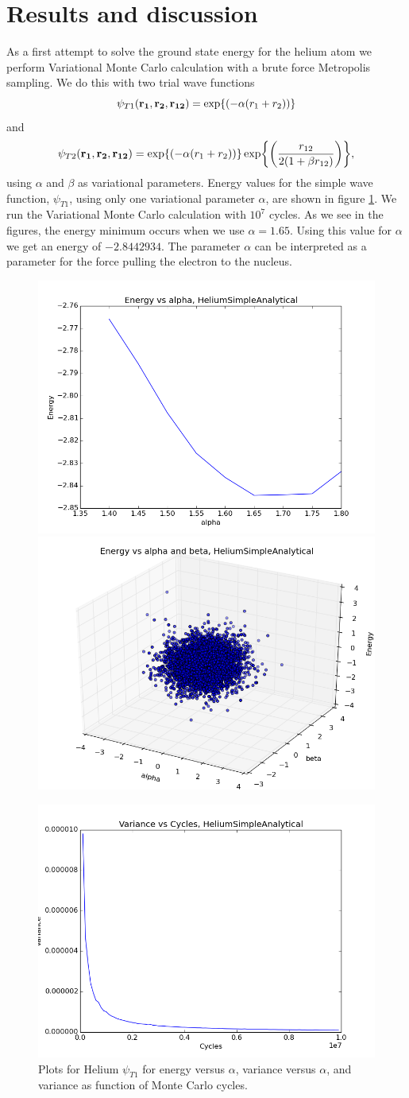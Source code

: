 \documentclass[11pt]{article}
\begin{document}
\section{Results and discussion}
	

As a first attempt to solve the ground state energy for the helium
atom we perform Variational Monte Carlo calculation with a brute force
Metropolis sampling. We do this with two trial wave functions
\[
\psi_{T1}({\bf r_{1}},{\bf r_{2}},{\bf r_{12}})=\exp{\left(-\alpha(r_{1}+r_{2})\right)}
\]
and 
\[
\psi_{T2}({\bf r_{1}},{\bf r_{2}},{\bf r_{12}})=\exp{\left(-\alpha(r_{1}+r_{2})\right)}\exp{\left(\frac{r_{12}}{2(1+\beta r_{12})}\right)},
\]
using $\alpha$ and $\beta$ as variational parameters. Energy values
for the simple wave function, $\psi_{T1}$, using only one variational
parameter $\alpha$, are shown in figure \ref{fig01:alpha_Simple}.
We run the Variational Monte Carlo calculation with $10^{7}$ cycles.
As we see in the figures, the energy minimum occurs when we use $\alpha=1.65$.
Using this value for $\alpha$ we get an energy of $-2.8442934$. 
The parameter $\alpha$ can be interpreted as a parameter for the
force pulling the electron to the nucleus. 

\begin{figure}
\centering \includegraphics[width=0.45\linewidth]{figures/EnergyVsAlphaHeliumSimpleAnalytical}
\includegraphics[width=0.45\linewidth]{figures/VarianceVsAlphaHeliumSimpleAnalytical}

\includegraphics[width=0.45\linewidth]{figures/VarianceNCyclesHeliumSimpleAnalytical}\protect\protect\caption{Plots for Helium $\psi_{T1}$ for energy versus $\alpha$, variance versus $\alpha$, and variance as function of Monte Carlo cycles.}
\label{fig01:alpha_Simple} 
\end{figure}
\end{document}

